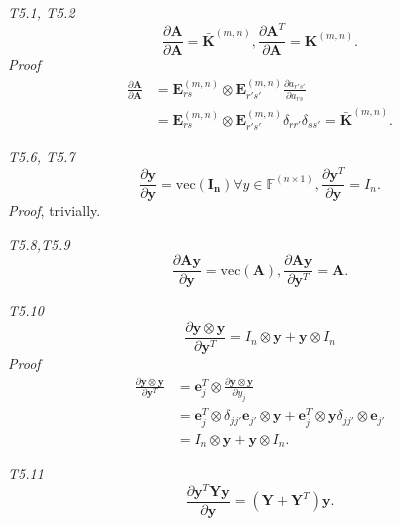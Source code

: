 \documentclass[a4paper,11pt]{article}
\def\m#1{\mathbf{#1}}
\def\v#1{\mathrm{vec}({\mathbf{#1}})}
\def\F{\mathbb{F}}
\begin{document}
\emph{T5.1, T5.2}
\begin{equation}
    \label{eq:self_dev}
    \frac{\partial \m A}{\partial \m A} = \bar{\m K}^{(m,n)}, \frac{\partial \m A^T}{\partial \m A} = \m K^{(m,n)}.
\end{equation}
\emph{Proof}
\begin{align}
    \frac{\partial \m A}{\partial \m A} & = \m E^{(m,n)}_{rs} \otimes \m E^{(m,n)}_{r's'}\frac{\partial a_{r's'}}{\partial a_{rs}} \\ & = \m E^{(m,n)}_{rs} \otimes \m E^{(m,n)}_{r's'} \delta_{rr'} \delta_{ss'} = \bar{\m K}^{(m,n)}.
\end{align}

\emph{T5.6, T5.7}
\begin{equation}
    \frac{\partial \m y}{\partial \m y} = \v {I_n} \forall y \in \F^{(n\times 1)}, \frac{\partial \m y^T}{\partial \m y} = I_n.
\end{equation}
\emph{Proof}, trivially.

\emph{T5.8,T5.9}
\begin{equation}
    \frac{\partial \m A \m y}{\partial \m y} = \v A, \frac{\partial \m A \m y}{\partial \m y^T} =\m A.
\end{equation}

\emph{T5.10}
\begin{equation}
    \frac{\partial \m y \otimes \m y}{\partial \m y^T} = I_n \otimes \m y + \m y \otimes I_n
\end{equation}
\emph{Proof}
\begin{align}
    \frac{\partial \m y \otimes \m y}{\partial \m y^T} & = \m e^T_{j} \otimes \frac{\partial \m y \otimes \m y}{\partial y_j} \\ & = \m e^T_{j} \otimes \delta_{jj'}\m e_{j'} \otimes \m y + \m e^T_{j} \otimes \m y \delta_{jj'} \otimes \m e_{j'} \\ & = I_n \otimes \m y + \m y \otimes I_n.
\end{align}

\emph{T5.11}
\begin{equation}
    \frac{\partial \m y^T \m Y \m y}{\partial \m y} = (\m Y + \m Y^T)\m y.
\end{equation}
\end{document}
